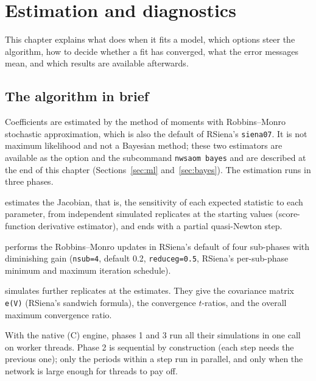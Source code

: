 \chapter{Estimation and diagnostics}\label{ch:estimation}

This chapter explains what \nwsaom{} does when it fits a model, which options steer the algorithm, how to decide whether a fit has converged, what the error messages mean, and which results are available afterwards. \section{The algorithm in brief}
Coefficients are estimated by the method of moments with Robbins--Monro stochastic approximation, which is also the default of RSiena's \texttt{siena07}. It is not maximum likelihood and not a Bayesian method; these two estimators are available as the option  and the subcommand \texttt{nwsaom bayes} and are described at the end of this chapter (Sections~\ref{sec:ml} and~\ref{sec:bayes}). The estimation runs in three phases.
\begin{description}[leftmargin=0pt,labelindent=0pt]
\item[Phase 1] estimates the Jacobian, that is, the sensitivity of each expected statistic to each parameter, from  independent simulated replicates at the starting values (score-function derivative estimator), and ends with a partial quasi-Newton step.
\item[Phase 2] performs the Robbins--Monro updates in RSiena's default of four sub-phases with diminishing gain (\texttt{nsub=4},  default 0.2, \texttt{reduceg=0.5}, RSiena's per-sub-phase minimum and maximum iteration schedule).
\item[Phase 3] simulates  further replicates at the estimates. They give the covariance matrix \texttt{e(V)} (RSiena's sandwich formula), the convergence $t$-ratios, and the overall maximum convergence ratio.
\end{description}
With the native (C) engine, phases 1 and 3 run all their simulations in one call on worker threads. Phase 2 is sequential by construction (each step needs the previous one); only the periods within a step run in parallel, and only when the network is large enough for threads to pay off.

